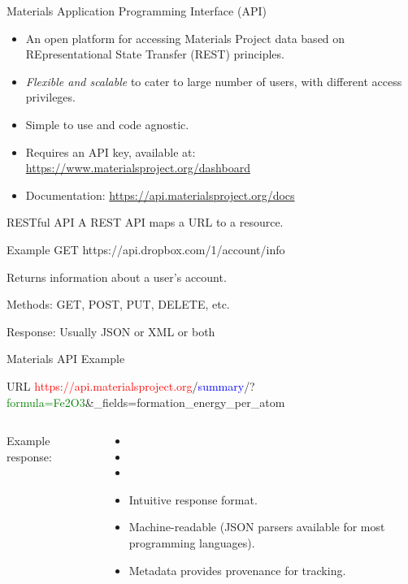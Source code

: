 \documentclass[aspectratio=169]{beamer}
\begin{document}
    \begin{frame}{Materials Application Programming Interface (API)\cite{ongMaterialsApplicationProgramming2015}}
        \begin{itemize}
            \item An open platform for accessing Materials Project data based on REpresentational State Transfer (REST) principles.
            \item \textit{Flexible and scalable} to cater to large number of users, with different access privileges.
            \item Simple to use and code agnostic.
            \item Requires an API key, available at: \url{https://www.materialsproject.org/dashboard}
            \item Documentation: \url{https://api.materialsproject.org/docs}
        \end{itemize}
    \end{frame}


    \begin{frame}{RESTful API}
        A REST API maps a URL to a resource.
        \begin{exampleblock}{Example}
            GET https://api.dropbox.com/1/account/info
        \end{exampleblock}
        Returns information about a user’s account.

        Methods: GET, POST, PUT, DELETE, etc.

        Response: Usually JSON or XML or both
    \end{frame}


    \begin{frame}{Materials API Example}
        \begin{exampleblock}{URL}
            \small
            \textcolor{red}{https://api.materialsproject.org}/\textcolor{blue}{summary}/?\textcolor{green}{formula=Fe2O3}\&\_fields=formation\_energy\_per\_atom\\
        \end{exampleblock}
        \begin{columns}
            Example response:
            \inputminted{json}{mapi_response.txt}
            \begin{itemize}
                \item[]
                \item[]
                \item[]
                \item Intuitive response format.
                \item Machine-readable (JSON parsers available for most programming languages).
                \item Metadata provides provenance for tracking.
            \end{itemize}
        \end{columns}
    \end{frame}
\end{document}
